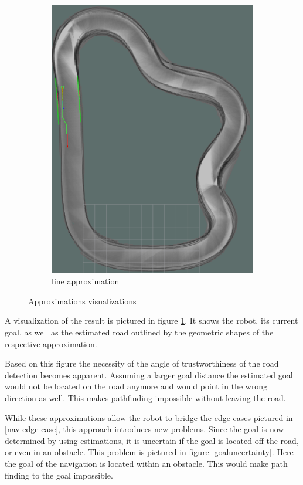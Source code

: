 \begin{figure}[H]
\begin{subfigure}{.45\linewidth}
		\includegraphics[width=\textwidth]{Pictures/lineapprox}
		\caption{line approximation}
	\end{subfigure}

	\caption{Approximations visualizations}
	\label{aproxvis}

\end{figure}

A visualization of the result is pictured in figure \ref{aproxvis}.
It shows the robot, its current goal, as well as the estimated road outlined by the geometric shapes of the respective approximation.

Based on this figure the necessity of the angle of trustworthiness of the road detection becomes apparent. Assuming a larger goal distance the estimated goal would not be located on the road anymore and would point in the wrong direction as well. This makes pathfinding impossible without leaving the road.


While these approximations allow the robot to bridge the edge cases pictured in \ref{nav edge case}, this approach introduces new problems. Since the goal is now determined by using estimations, it is uncertain if the goal is located off the road, or even in an obstacle. This problem is pictured in figure \ref{goaluncertainty}. Here the goal of the navigation is located within an obstacle. This would make path finding to the goal impossible.\\

